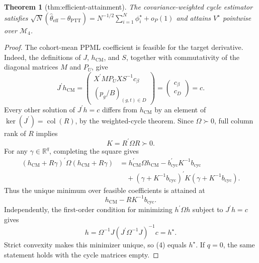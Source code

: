 \documentclass{article}
\newtheorem{theorem}{Theorem}
\begin{document}
\begin{theorem}[thm:efficient-attainment]\label{thm:efficient-attainment}
The covariance-weighted cycle estimator satisfies \(\sqrt N(\widehat\theta_{\mathrm{eff}}-\theta_{\mathrm{PTT}})=N^{-1/2}\sum_{i=1}^N\phi_i^{\star}+o_P(1)\) and attains \(V^{\star}\) pointwise over \(\mathcal M_4\).
\end{theorem}
\begin{proof}
The cohort-mean PPML coefficient is feasible for the target derivative.  Indeed, the definitions of \(J\), \(h_{\mathrm{CM}}\), and \(S\), together with commutativity of the diagonal matrices \(M\) and \(P_U\), give
\[
J^{\prime}h_{\mathrm{CM}}
=\begin{pmatrix}
X^{\prime}MP_UXS^{-1}c_\beta\\
(p_g/B)_{(g,t)\in D}
\end{pmatrix}
=\begin{pmatrix}c_\beta\\c_D\end{pmatrix}
=c.                                                                      \tag{1}
\]
Every other solution of \(J^{\prime}h=c\) differs from \(h_{\mathrm{CM}}\) by an element of \(\ker(J^{\prime})=\operatorname{col}(R)\), by the weighted-cycle theorem.  Since \(\Omega\succ0\), full column rank of \(R\) implies
\[
K=R^{\prime}\Omega R\succ0.                                            \tag{2}
\]
For any \(\gamma\in\mathbb R^q\), completing the square gives
\[
\begin{aligned}
(h_{\mathrm{CM}}+R\gamma)^{\prime}\Omega(h_{\mathrm{CM}}+R\gamma)
&=h_{\mathrm{CM}}^{\prime}\Omega h_{\mathrm{CM}}
 -b_{\mathrm{cyc}}^{\prime}K^{-1}b_{\mathrm{cyc}}\\
&\quad+(\gamma+K^{-1}b_{\mathrm{cyc}})^{\prime}
 K(\gamma+K^{-1}b_{\mathrm{cyc}}).                                    \tag{3}
\end{aligned}
\]
Thus the unique minimum over feasible coefficients is attained at
\[
h_{\mathrm{CM}}-RK^{-1}b_{\mathrm{cyc}}.                               \tag{4}
\]
Independently, the first-order condition for minimizing \(h^{\prime}\Omega h\) subject to \(J^{\prime}h=c\) gives
\[
h=\Omega^{-1}J(J^{\prime}\Omega^{-1}J)^{-1}c=h^{\star}.                \tag{5}
\]
Strict convexity makes this minimizer unique, so (4) equals \(h^{\star}\).  If \(q=0\), the same statement holds with the cycle matrices empty.


\end{proof}
\end{document}
